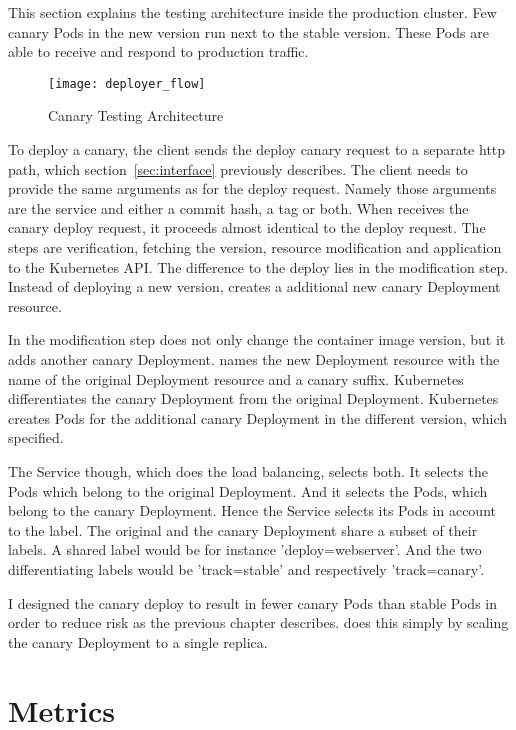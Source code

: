 This section explains the testing architecture inside the production cluster. Few canary
Pods in the new version run next to the stable version. These Pods are able to receive and
respond to production traffic.

\begin{figure}[htbp] \centering \texttt{[image: deployer\_flow]}
  \caption{Canary Testing Architecture}
  \label{fig:testing_flow}
\end{figure}


To deploy a canary, the client sends the deploy canary request to a separate http path,
which section~\ref{sec:interface} previously describes. The client needs to provide the
same arguments as for the deploy request. Namely those arguments are the service and
either a commit hash, a tag or both. When \deployer receives the canary deploy request, it
proceeds almost identical to the deploy request. The steps are verification, fetching the
version, resource modification and application to the Kubernetes API. The difference to
the deploy lies in the modification step. Instead of deploying a new version, \deployer
creates a additional new canary Deployment resource.

In the modification step \deployer does not only change the container image version, but
it adds another canary Deployment. \deployer names the new Deployment resource with the
name of the original Deployment resource and a canary suffix. Kubernetes differentiates
the canary Deployment from the original Deployment. Kubernetes creates Pods for the
additional canary Deployment in the different version, which \deployer specified.

The Service though, which does the load balancing, selects both. It selects the Pods which
belong to the original Deployment. And it selects the Pods, which belong to the canary
Deployment. Hence the Service selects its Pods in account to the label. The original and
the canary Deployment share a subset of their labels. A shared label would be for instance
'deploy=webserver'. And the two differentiating labels would be 'track=stable' and
respectively 'track=canary'.

I designed the canary deploy to result in fewer canary Pods than stable Pods in order to
reduce risk as the previous chapter describes. \deployer does this simply by scaling the
canary Deployment to a single replica.

\section{Metrics}


